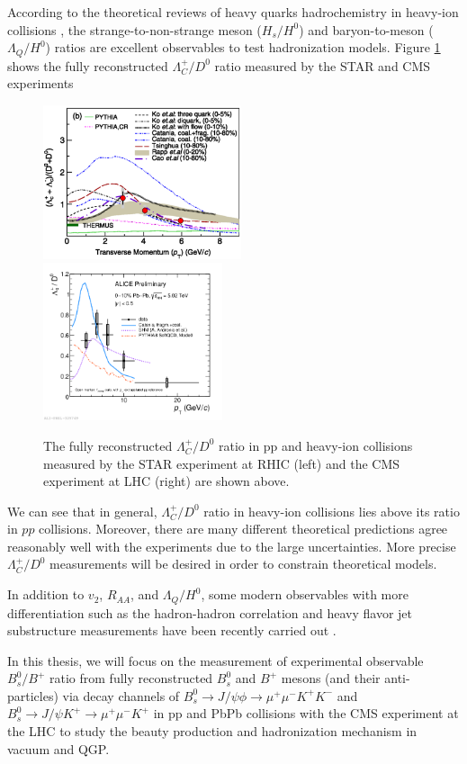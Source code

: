 According to the theoretical reviews of heavy quarks hadrochemistry in heavy-ion collisions \cite{StrangetoLight,BaryontoMeson}, the strange-to-non-strange meson ($H_s/H^0$) and baryon-to-meson ($\Lambda_{Q}/H^{0}$) ratios are excellent observables to test hadronization models. Figure \ref{HadroPlotCharm} shows the fully reconstructed $\Lambda_C^+/D^0$ ratio measured by the STAR and CMS experiments

\begin{figure}[hbtp]
\begin{center}
\includegraphics[width=0.52\textwidth]{Figures/Chapter1/STARLambdaCD0.png}
\includegraphics[width=0.47\textwidth]{Figures/Chapter1/ALICELambdaCD0}
\caption{The fully reconstructed $\Lambda_C^+/D^0$ ratio in pp and heavy-ion collisions measured by the STAR experiment at RHIC (left) and the CMS experiment at LHC (right) are shown above.}
\label{HadroPlotCharm}
\end{center}
\end{figure}   

We can see that in general, $\Lambda_C^+/D^0$ ratio in heavy-ion collisions lies above its ratio in $pp$ collisions. Moreover, there are many different theoretical predictions agree reasonably well with the experiments due to the large uncertainties. More precise $\Lambda_C^+/D^0$ measurements will be desired in order to constrain theoretical models.

In addition to $v_2$, $R_{AA}$, and $\Lambda_{Q}/H^{0}$, some modern observables with more differentiation such as the hadron-hadron correlation and heavy flavor jet substructure measurements have been recently carried out \cite{DDbar,DJet}. 

In this thesis, we will focus on the measurement of experimental observable $B^0_s/B^+$ ratio from fully reconstructed $B^0_s$ and $B^+$ mesons (and their anti-particles) via decay channels of $B^0_s \rightarrow J/\psi \phi \rightarrow \mu^+ \mu^- K^+ K^-$ and $B^0_s \rightarrow J/\psi K^+ \rightarrow \mu^+ \mu^- K^+$ in pp and PbPb collisions with the CMS experiment at the LHC to study the beauty production and hadronization mechanism in vacuum and QGP. 


